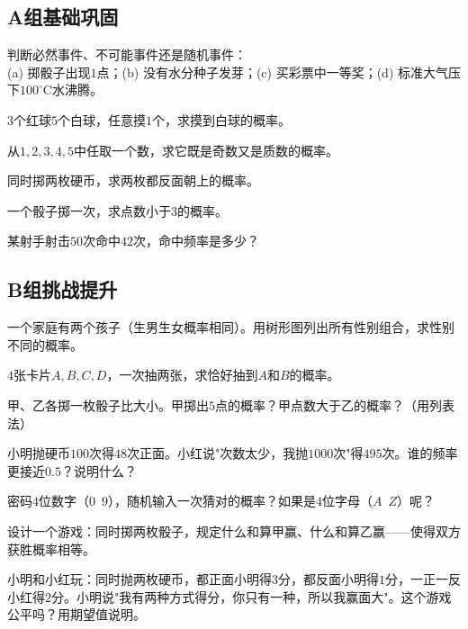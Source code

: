 
\subsection*{A组\quad 基础巩固}

\begin{exercise}
\item 判断必然事件、不可能事件还是随机事件：\\
(a) 掷骰子出现$1$点；(b) 没有水分种子发芽；(c) 买彩票中一等奖；(d) 标准大气压下$100^\circ$C水沸腾。
\item $3$个红球$5$个白球，任意摸$1$个，求摸到白球的概率。
\item 从$1,2,3,4,5$中任取一个数，求它既是奇数又是质数的概率。
\item 同时掷两枚硬币，求两枚都反面朝上的概率。
\item 一个骰子掷一次，求点数小于$3$的概率。
\item 某射手射击$50$次命中$42$次，命中频率是多少？
\end{exercise}

\subsection*{B组\quad 挑战提升}

\begin{exercise}
\item 一个家庭有两个孩子（生男生女概率相同）。用树形图列出所有性别组合，求性别不同的概率。
\item $4$张卡片$A,B,C,D$，一次抽两张，求恰好抽到$A$和$B$的概率。
\item 甲、乙各掷一枚骰子比大小。甲掷出$5$点的概率？甲点数大于乙的概率？（用列表法）
\item 小明抛硬币$100$次得$48$次正面。小红说"次数太少，我抛$1000$次"得$495$次。谁的频率更接近$0.5$？说明什么？
\item 密码$4$位数字（$0$~$9$），随机输入一次猜对的概率？如果是$4$位字母（$A$~$Z$）呢？
\item 设计一个游戏：同时掷两枚骰子，规定什么和算甲赢、什么和算乙赢——使得双方获胜概率相等。
\item 小明和小红玩：同时抛两枚硬币，都正面小明得$3$分，都反面小明得$1$分，一正一反小红得$2$分。小明说"我有两种方式得分，你只有一种，所以我赢面大"。这个游戏公平吗？用期望值说明。
\end{exercise}

\newpage
